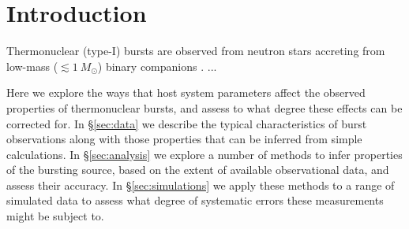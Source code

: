 \documentclass{aastex63}
\begin{document}

\section{Introduction} \label{sec:intro}

Thermonuclear (type-I) bursts are observed from neutron stars accreting from low-mass ($\lesssim 1\ M_\odot$) binary companions \cite[e.g.][]{gal21a}. ...

Here we explore the ways that host system  parameters affect the observed properties of thermonuclear bursts, and assess to what degree these effects can be corrected for.
%
In \S\ref{sec:data} we describe the typical characteristics of burst observations along with those properties that can be 
inferred from simple calculations. %
% 
In \S\ref{sec:analysis} we explore a number of methods to infer properties of the bursting source, based on the extent of available observational data, and assess their accuracy.
%
In \S\ref{sec:simulations} we apply these methods to a range of simulated data to assess what degree of systematic errors these measurements might be subject to.
\end{document}
